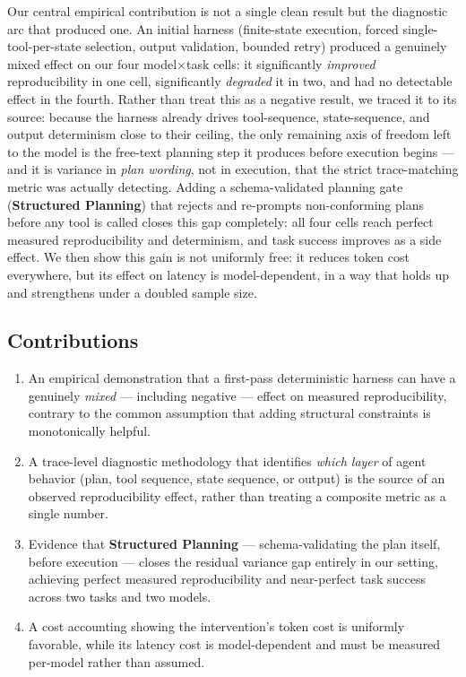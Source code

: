 \documentclass[11pt]{article}
\begin{document}
Our central empirical contribution is not a single clean result but the diagnostic arc that produced one. An initial harness (finite-state execution, forced single-tool-per-state selection, output validation, bounded retry) produced a genuinely mixed effect on our four model$\times$task cells: it significantly \emph{improved} reproducibility in one cell, significantly \emph{degraded} it in two, and had no detectable effect in the fourth. Rather than treat this as a negative result, we traced it to its source: because the harness already drives tool-sequence, state-sequence, and output determinism close to their ceiling, the only remaining axis of freedom left to the model is the free-text planning step it produces before execution begins --- and it is variance in \emph{plan wording}, not in execution, that the strict trace-matching metric was actually detecting. Adding a schema-validated planning gate (\textbf{Structured Planning}) that rejects and re-prompts non-conforming plans before any tool is called closes this gap completely: all four cells reach perfect measured reproducibility and determinism, and task success improves as a side effect. We then show this gain is not uniformly free: it reduces token cost everywhere, but its effect on latency is model-dependent, in a way that holds up and strengthens under a doubled sample size.

\subsection{Contributions}
\begin{enumerate}
\item An empirical demonstration that a first-pass deterministic harness can have a genuinely \emph{mixed} --- including negative --- effect on measured reproducibility, contrary to the common assumption that adding structural constraints is monotonically helpful.
\item A trace-level diagnostic methodology that identifies \emph{which layer} of agent behavior (plan, tool sequence, state sequence, or output) is the source of an observed reproducibility effect, rather than treating a composite metric as a single number.
\item Evidence that \textbf{Structured Planning} --- schema-validating the plan itself, before execution --- closes the residual variance gap entirely in our setting, achieving perfect measured reproducibility and near-perfect task success across two tasks and two models.
\item A cost accounting showing the intervention's token cost is uniformly favorable, while its latency cost is model-dependent and must be measured per-model rather than assumed.
\end{enumerate}
\end{document}
